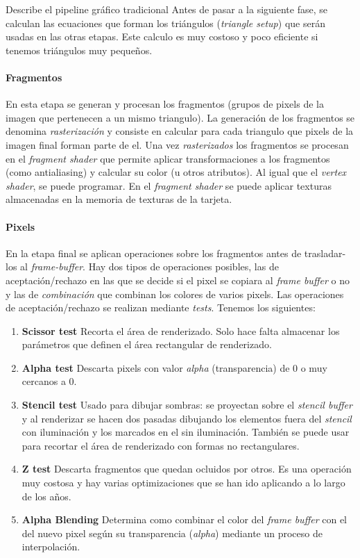 \begin{pregunta}{Describe el pipeline gráfico tradicional}
Antes de pasar a la siguiente fase, se calculan las ecuaciones que forman los
triángulos (\emph{triangle setup}) que serán usadas en las otras etapas. Este
calculo es muy costoso y poco eficiente si tenemos triángulos muy pequeños.

\paragraph{Fragmentos} En esta etapa se generan y procesan los fragmentos
(grupos de pixels de la imagen que pertenecen a un mismo triangulo). La
generación de los fragmentos se denomina \emph{rasterización} y consiste en
calcular para cada triangulo que pixels de la imagen final forman parte de el.
Una vez \emph{rasterizados} los fragmentos se procesan en el \emph{fragment
shader} que permite aplicar transformaciones a los fragmentos (como antialiasing) y
calcular su color (u otros atributos). Al igual que el \emph{vertex shader}, se
puede programar. En el \emph{fragment shader} se puede aplicar texturas
almacenadas en la memoria de texturas de la tarjeta.

\paragraph{Pixels} En la etapa final se aplican operaciones sobre los fragmentos
antes de trasladar-los al \emph{frame-buffer}. Hay dos tipos de operaciones
posibles, las de aceptación/rechazo en las que se decide si el pixel se copiara
al \emph{frame buffer} o no y las de \emph{combinación} que combinan los colores
de varios pixels. Las operaciones de aceptación/rechazo se realizan mediante
\emph{tests}. Tenemos los siguientes:

\begin{enumerate}
    \item \textbf{Scissor test} Recorta el área de renderizado. Solo hace falta
        almacenar los parámetros que definen el área rectangular de renderizado.
    \item \textbf{Alpha test} Descarta pixels con valor \emph{alpha}
        (transparencia) de 0 o muy cercanos a 0.
    \item \textbf{Stencil test} Usado para dibujar sombras: se proyectan sobre
        el \emph{stencil buffer} y al renderizar se hacen dos pasadas dibujando
        los elementos fuera del \emph{stencil} con iluminación y los marcados en
        el sin iluminación. También se puede usar para recortar el área de
        renderizado con formas no rectangulares.
    \item \textbf{Z test} Descarta fragmentos que quedan ocluidos por otros.
        Es una operación muy costosa y hay varias optimizaciones que se han ido
        aplicando a lo largo de los años.
    \item \textbf{Alpha Blending} Determina como combinar el color del
        \emph{frame buffer} con el del nuevo pixel según su transparencia (\emph{alpha})
        mediante un proceso de interpolación.
\end{enumerate}


\end{pregunta}
